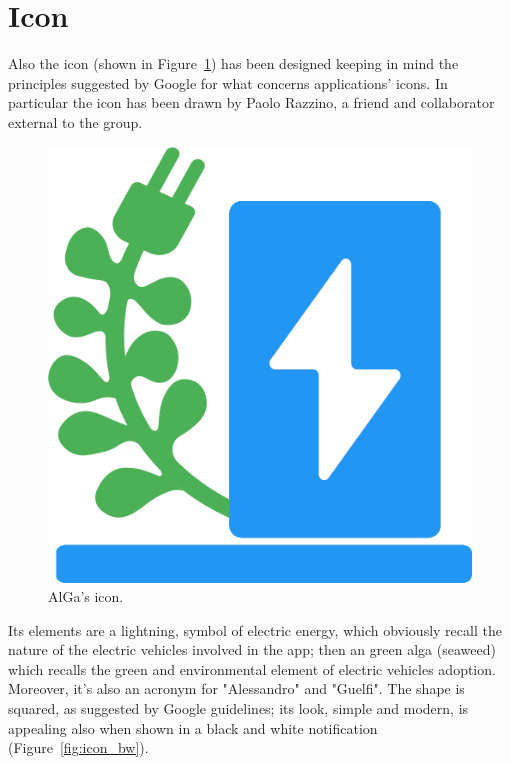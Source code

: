 \section{Icon}
Also the icon (shown in Figure~\ref{fig:icon}) has been designed keeping in mind the principles suggested by Google for what concerns applications' icons.
In particular the icon has been drawn by Paolo Razzino, a friend and collaborator external to the group.
\begin{figure}[h]
    \centering
    \includegraphics[scale=0.5]{Pics/icon.png}
    \caption{AlGa's icon.}
    \label{fig:icon}
\end{figure}
Its elements are a lightning, symbol of electric energy, which obviously recall the nature of the electric vehicles involved in the app; then an green alga (seaweed) which recalls the green and environmental element of electric vehicles adoption. Moreover, it's also an acronym for "Alessandro" and "Guelfi".
The shape is squared, as suggested by Google guidelines; its look, simple and modern, is appealing also when shown in a black and white notification (Figure~\ref{fig:icon_bw}).
